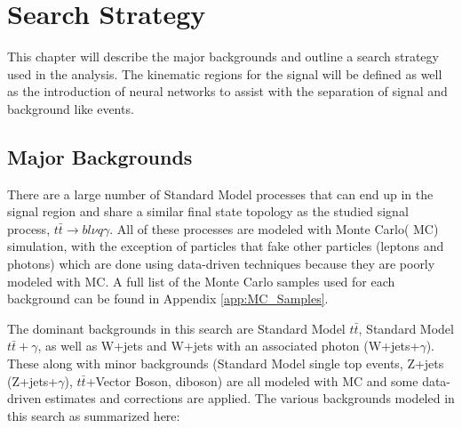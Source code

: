 
\chapter{Search Strategy}
\label{ch:SearchStrategy}
This chapter will describe the major backgrounds and outline a search strategy used in the analysis.  The kinematic regions for the signal will be defined as well as the introduction of neural networks to assist with the separation of signal and background like events.


\section{Major Backgrounds}
There are a large number of Standard Model processes that can end up in the signal region and share a similar final state topology as the studied signal process, $t\bar{t}\rightarrow b l \nu q \gamma$.  All of these processes are modeled with Monte Carlo( MC) simulation, with the exception of particles that fake other particles (leptons and photons) which are done using data-driven techniques because they are poorly modeled with MC.  A full list of the Monte Carlo samples used for each background can be found in Appendix \ref{app:MC_Samples}. 

The dominant backgrounds in this search are Standard Model $t\bar{t}$, Standard Model $t\bar{t}+\gamma$, as well as W+jets and W+jets with an associated photon (W+jets+$\gamma$).  These along with minor backgrounds (Standard Model single top events, Z+jets (Z+jets+$\gamma$), $t\bar{t}$+Vector Boson, diboson) are all modeled with MC and some data-driven estimates and corrections are applied.  The various backgrounds modeled in this search as summarized here:

